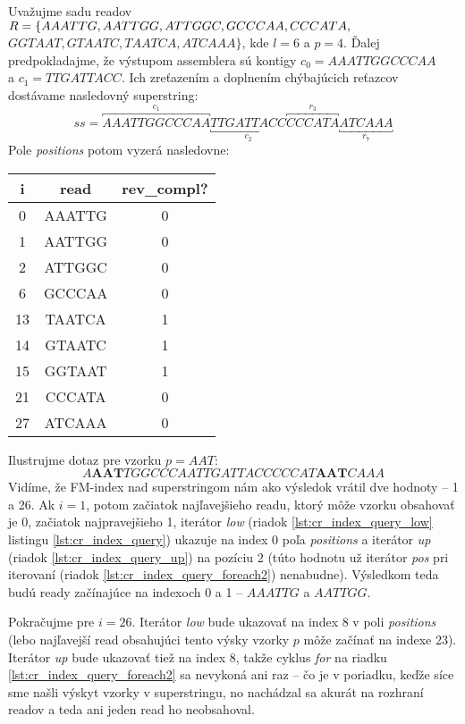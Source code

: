 \begin{example}
Uvažujme sadu readov $R=\{AAATTG, AATTGG, ATTGGC, GCCCAA,\\ CCCATA, $ $GGTAAT, GTAATC, TAATCA, ATCAAA\}$, kde $l=6$ a $p=4$. Ďalej predpokladajme, že výstupom assemblera sú kontigy $c_0=AAATTGGCCCAA$ \\ a $c_1=TTGATTACC$. Ich zreťazením a doplnením chýbajúcich reťazcov dostávame nasledovný superstring: \\
$$
  ss=
  \overbracket{AAATTGGCCCAA}^{c_1}
  \underbracket{TTGATTACC}_{c_2}
  \overbracket{CCCATA}^{r_3}
  \underbracket{ATCAAA}_{r_7}
$$
Pole \emph{positions} potom vyzerá nasledovne:

\begin{center}
    \begin{tabular}{ | c | c | c | }
        \hline
        \textbf{i} & \textbf{read} & \textbf{rev\_compl?} \\ \hline
        0  & AAATTG & 0 \\ \hline
        1  & AATTGG & 0 \\ \hline
        2  & ATTGGC & 0 \\ \hline
        6  & GCCCAA & 0 \\ \hline
        13 & TAATCA & 1 \\ \hline
        14 & GTAATC & 1 \\ \hline
        15 & GGTAAT & 1 \\ \hline
        21 & CCCATA & 0 \\ \hline
        27 & ATCAAA & 0 \\ \hline
    \end{tabular}
\end{center}
\bigskip

Ilustrujme dotaz pre vzorku $p=AAT$:
$$
A\mathbf{AAT}TGGCCCAATTGATTACCCCCAT\mathbf{AAT}CAAA
$$
Vidíme, že FM-index nad superstringom nám ako výsledok vrátil dve hodnoty -- 1 a 26. Ak $i=1$, potom začiatok najľavejšieho readu, ktorý môže vzorku obsahovať je 0, začiatok najpravejšieho 1, iterátor \emph{low} (riadok \ref{lst:cr_index_query_low} listingu \ref{lst:cr_index_query}) ukazuje na index 0 poľa \emph{positions} a iterátor \emph{up} (riadok \ref{lst:cr_index_query_up}) na pozíciu 2 (túto hodnotu už iterátor \emph{pos} pri iterovaní (riadok \ref{lst:cr_index_query_foreach2}) nenabudne). Výsledkom teda budú ready začínajúce na indexoch 0 a 1 -- $AAATTG$ a $AATTGG$.

Pokračujme pre $i=26$. Iterátor \emph{low} bude ukazovať na index 8 v poli \emph{positions} (lebo najľavejší read obsahujúci tento výsky vzorky $p$ môže začínať na indexe 23). Iterátor \emph{up} bude ukazovať tiež na index 8, takže cyklus \emph{for} na riadku \ref{lst:cr_index_query_foreach2} sa nevykoná ani raz -- čo je v poriadku, keďže síce sme našli výskyt vzorky v superstringu, no nachádzal sa akurát na rozhraní readov a teda ani jeden read ho neobsahoval.


\end{example}
